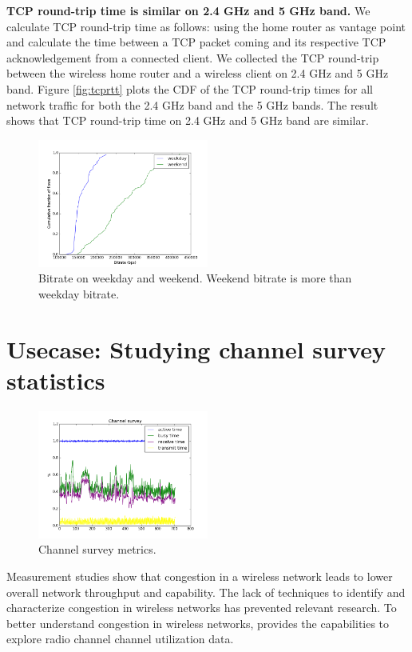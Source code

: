 \textbf{TCP round-trip time is similar on 2.4 GHz and 5 GHz band.} We calculate TCP round-trip time as follows: using the home router as vantage point and calculate the time between a TCP packet coming and its respective TCP acknowledgement from a connected client. We collected the TCP round-trip between the wireless home router and a wireless client on 2.4 GHz and 5 GHz band. Figure \ref{fig:tcprtt} plots the CDF of the TCP round-trip times for all network traffic for both the 2.4 GHz band and the 5 GHz bands. The result shows that TCP round-trip time on 2.4 GHz and 5 GHz band are similar.

\begin{figure}
\centering
\includegraphics[width=0.5\textwidth]{figure/bitrate(weekday_vs_weekend).png}
\caption{Bitrate on weekday and weekend. Weekend bitrate is more than weekday bitrate.} 
\label{fig:compare}
\end{figure}  

\section{Usecase: Studying channel survey statistics}
\label{sec.usecase2}

\begin{figure}
\centering
\includegraphics[width=0.5\textwidth]{figure/channel.png}
\caption{Channel survey metrics.} 
\label{fig:channelsurvey}
\end{figure}

Measurement studies show that congestion in a wireless network leads to lower overall network throughput and capability. The lack of techniques to identify and characterize congestion in wireless networks has prevented relevant research. To better understand congestion in wireless networks, \sysname provides the capabilities to explore radio channel channel utilization data. 

